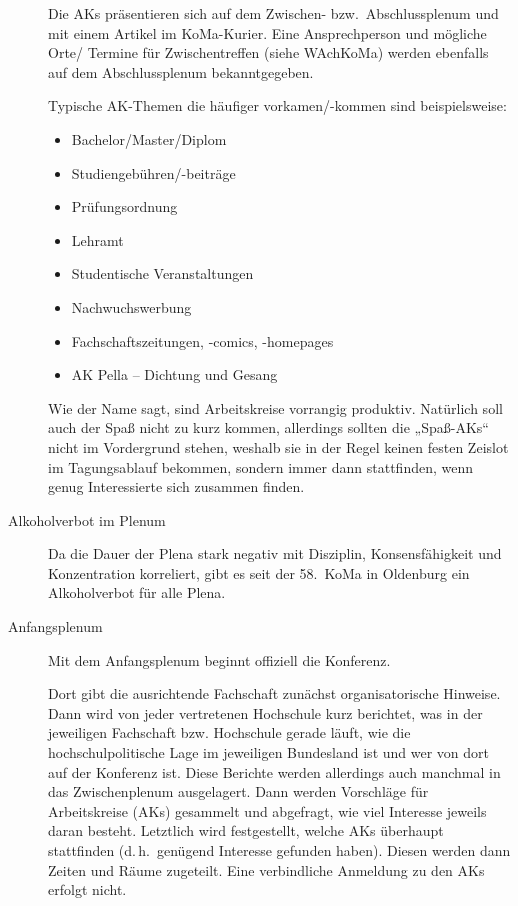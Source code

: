 \begin{description}
	Die AKs präsentieren sich auf dem Zwischen- bzw.\ Abschlussplenum und mit einem Artikel im KoMa-Kurier. Eine Ansprechperson und mögliche Orte/ Termine für Zwischentreffen (siehe WAchKoMa) werden ebenfalls auf dem Abschlussplenum bekanntgegeben.

	Typische AK-Themen die häufiger vorkamen/-kommen sind beispielsweise:
	\begin{itemize}
		\item Bachelor/Master/Diplom
		\item Studiengebühren/-beiträge
		\item Prüfungsordnung
		\item Lehramt
		\item Studentische Veranstaltungen
		\item Nachwuchswerbung
		\item Fachschaftszeitungen, -comics, -homepages
		\item AK Pella -- Dichtung und Gesang
	\end{itemize}
	Wie der Name sagt, sind Arbeitskreise vorrangig produktiv. Natürlich soll auch der Spaß nicht zu kurz kommen, allerdings sollten die „Spaß-AKs“ nicht im Vordergrund stehen, weshalb sie in der Regel keinen festen Zeislot im Tagungsablauf bekommen, sondern immer dann stattfinden, wenn genug Interessierte sich zusammen finden.

\item[Alkoholverbot im Plenum]
    Da die Dauer der Plena stark negativ mit Disziplin, Konsensfähigkeit und Konzentration korreliert, gibt es seit der 58.~KoMa in Oldenburg ein Alkoholverbot für alle Plena.

\item[Anfangsplenum]
    Mit dem Anfangsplenum beginnt offiziell die Konferenz.

    Dort gibt die ausrichtende Fachschaft zunächst organisatorische Hinweise. Dann wird von jeder vertretenen Hochschule kurz berichtet, was in der jeweiligen Fachschaft bzw. Hochschule gerade läuft, wie die hochschulpolitische Lage im jeweiligen Bundesland ist und wer von dort auf der Konferenz ist. Diese Berichte werden allerdings auch manchmal in das Zwischenplenum ausgelagert. Dann werden Vorschläge für Arbeitskreise (AKs) gesammelt und abgefragt, wie viel Interesse jeweils daran besteht. Letztlich wird festgestellt, welche AKs überhaupt stattfinden (d.\,h.\ genügend Interesse gefunden haben). Diesen werden dann Zeiten und Räume zugeteilt. Eine verbindliche Anmeldung zu den AKs erfolgt nicht.


\end{description}
